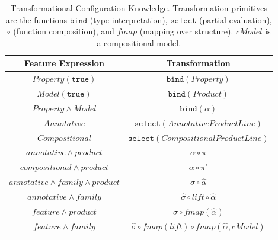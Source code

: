 	\begin{table}[htb]
		\centering
		
		\caption{Transformational Configuration Knowledge. Transformation primitives are the functions $\mathtt{bind}$ (type interpretation), $\mathtt{select}$ (partial evaluation), $\circ$ (function composition), and   $\mathit{fmap}$ (mapping over structure). $cModel$ is a compositional model.}
			\begin{tabular}{cc}
				\toprule
				
				\textbf{Feature Expression} & \textbf{Transformation} \\\midrule
				$\mathit{Property \mathtt{(true)}}$ & $\mathtt{bind}(\mathit{Property})$  \\
				$\mathit{Model \mathtt{(true)}}$ & $\mathtt{bind}(\mathit{Product})$ \\
				$\mathit{Property} \land \mathit{Model}$     &  $\mathtt{bind}(\mathit{\alpha})$    \\
				$\mathit{Annotative}$ & $\mathtt{select}(\mathit{Annotative Product Line})$ \\
				$\mathit{Compositional}$  & $\mathtt{select}(\mathit{Compositional Product Line})$ \\    
				$\mathit{annotative} \land \mathit{product}$   &  $  \alpha  \circ \pi  $  \\    
				$\mathit{compositional} \land \mathit{product}$  &  $  \alpha \circ \pi' $  \\    
				$\mathit{annotative} \land \mathit{family} \land \mathit{product}$ &  $\sigma \circ \hat{\alpha}$  \\    
				$\mathit{annotative} \land \mathit{family}$ &  $\hat{\sigma}  \circ \mathit{lift}   \circ \hat{\alpha} $  \\    
				$\mathit{feature} \land \mathit{product}$  & $  \sigma  \circ \mathit{fmap(\hat{\alpha})} $ \\    
				$\mathit{feature} \land \mathit{family}$  & $ \hat{\sigma} \circ \mathit{fmap(lift)} \circ \mathit{fmap(\hat{\alpha},cModel)}$ \\    
				\bottomrule
			\end{tabular}
		\label{fig:ck}
	\end{table}





